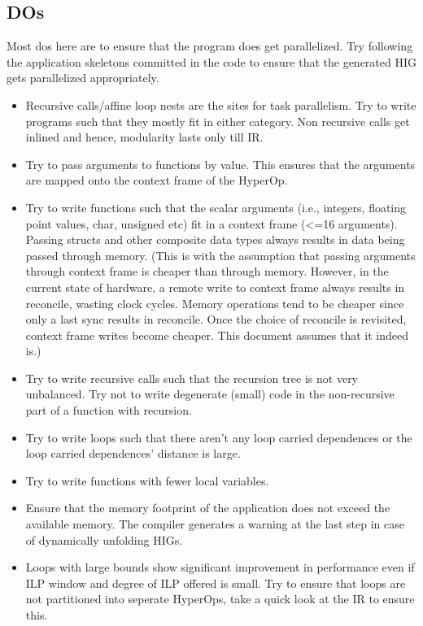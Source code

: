 \documentclass[12pt]{article}
\begin{document}
\subsection{DOs}
Most dos here are to ensure that the program does get parallelized. Try following the application skeletons committed in the code to ensure that the generated HIG gets parallelized appropriately.
\begin{itemize}
 \item Recursive calls/affine loop nests are the sites for task parallelism. Try to write programs such that they mostly fit in either category. Non recursive calls get inlined and hence, modularity lasts only till IR.
 \item Try to pass arguments to functions by value. This ensures that the arguments are mapped onto the context frame of the HyperOp.
 \item Try to write functions such that the scalar arguments (i.e., integers, floating point values, char, unsigned etc) fit in a context frame (<=16 arguments). Passing structs and other composite data types always results in data being passed through memory. (This is with the assumption that passing arguments through context frame is cheaper than through memory. However, in the current state of hardware, a remote write to context frame always results in reconcile, wasting clock cycles. Memory operations tend to be cheaper since only a last sync results in reconcile. Once the choice of reconcile is revisited, context frame writes become cheaper. This document assumes that it indeed is.)
 \item Try to write recursive calls such that the recursion tree is not very unbalanced. Try not to write degenerate (small) code in the non-recursive part of a function with recursion. 
 \item Try to write loops such that there aren't any loop carried dependences or the loop carried dependences' distance is large.
 \item Try to write functions with fewer local variables.
 \item Ensure that the memory footprint of the application does not exceed the available memory. The compiler generates a warning at the last step in case of dynamically unfolding HIGs.
 \item Loops with large bounds show significant improvement in performance even if ILP window and degree of ILP offered is small. Try to ensure that loops are not partitioned into seperate HyperOps, take a quick look at the IR to ensure this.
\end{itemize}
\end{document}
